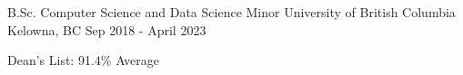 

\begin{cventries}

  \cventry
    {B.Sc. Computer Science and Data Science Minor} %
    {University of British Columbia} %
    {Kelowna, BC} %
    {Sep 2018 - April 2023} %
    {
      \begin{cvitems} %
        \item {Dean's List: 91.4\% Average}
      \end{cvitems}
    }

\end{cventries}
